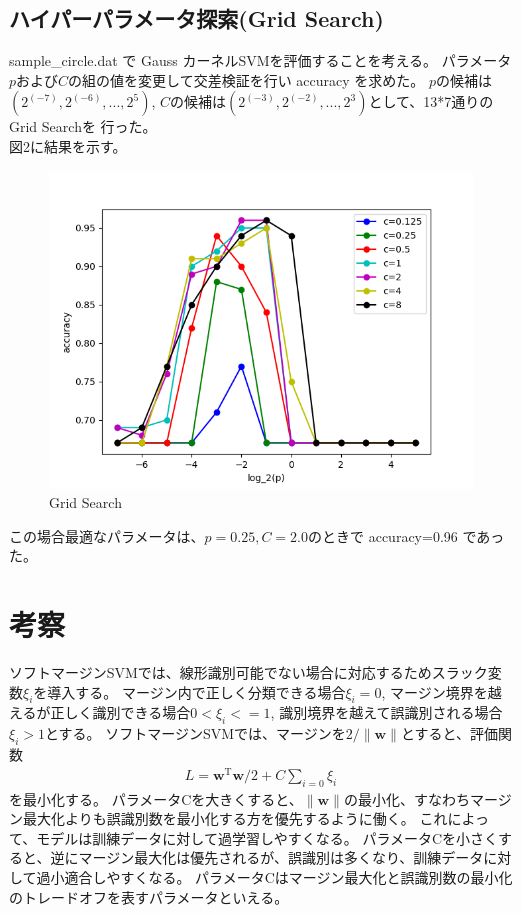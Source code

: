 \documentclass{jsarticle}
\begin{document}
\subsection{ハイパーパラメータ探索(Grid Search)}
sample\_circle.dat で Gauss カーネルSVMを評価することを考える。
パラメータ$p$および$C$の組の値を変更して交差検証を行い accuracy を求めた。
$p$の候補は$(2^(-7), 2^(-6), ..., 2^5)$, $C$の候補は$(2^(-3), 2^(-2), ..., 2^3)$として、13*7通りのGrid Searchを
行った。\\
図2に結果を示す。
\begin{figure}[!h]
\centering \includegraphics[width=15cm]{grid_search.png}
\caption{Grid Search}
\end{figure}
この場合最適なパラメータは、$p=0.25, C=2.0$のときで accuracy=0.96 であった。

\section{考察}
ソフトマージンSVMでは、線形識別可能でない場合に対応するためスラック変数$\xi_i$を導入する。
マージン内で正しく分類できる場合$\xi_i = 0$, マージン境界を越えるが正しく識別できる場合$0 < \xi_i <= 1$, 
識別境界を越えて誤識別される場合$\xi_i > 1$とする。
ソフトマージンSVMでは、マージンを$2 / \|\bm{w}\|$とすると、評価関数
\begin{eqnarray}
L = \bm{w}^{\mathrm{T}}\bm{w} / 2 + C \sum_{i=0} \xi_i
\end{eqnarray}
を最小化する。
パラメータCを大きくすると、$\|\bm{w}\|$の最小化、すなわちマージン最大化よりも誤識別数を最小化する方を優先するように働く。
これによって、モデルは訓練データに対して過学習しやすくなる。
パラメータCを小さくすると、逆にマージン最大化は優先されるが、誤識別は多くなり、訓練データに対して過小適合しやすくなる。
パラメータCはマージン最大化と誤識別数の最小化のトレードオフを表すパラメータといえる。
\end{document}
